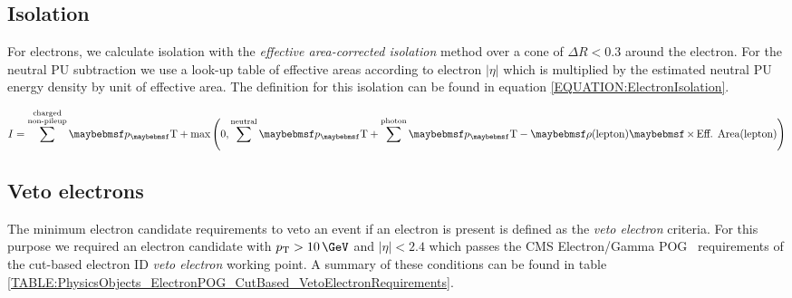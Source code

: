 \subsection{Isolation}
\label{SUBSECTION:EventReconstructionAndSimulation_LeptonIsolation_Isolation}



For electrons, we calculate isolation with the \textit{effective area-corrected isolation} method over a cone of $\Delta R<0.3$ around the electron. For the neutral \gls{PU} subtraction we use a look-up table of effective areas according to electron $|\eta|$ which is multiplied by the estimated neutral \gls{PU} energy density by unit of effective area. The definition for this isolation can be found in equation \ref{EQUATION:ElectronIsolation}.

\begin{equation}
I = \sum^{\substack{\text{charged} \\ \text{non-pileup}}}\pT +
\text{max}\left(0,\sum^{\text{neutral}}\pT+\sum^{\text{photon}}\pT - \rho(\text{lepton}) \times \text{Eff. Area}(\text{lepton})\right)
\label{EQUATION:ElectronIsolation}
\end{equation}

\subsection{Veto electrons}


The minimum electron candidate requirements to veto an event if an electron is present is defined as the \textit{veto electron} criteria. For this purpose we required an electron candidate with $\pt>10\,\GeV$ and $|\eta|<2.4$ which passes the \gls{CMS} Electron/Gamma \gls{POG}~\cite{ARTICLE:CMSElectronReconstruction7TeV} requirements of the cut-based electron \gls{ID} \textit{veto electron} working point. A summary of these conditions can be found in table \ref{TABLE:PhysicsObjects_ElectronPOG_CutBased_VetoElectronRequirements}.
 
